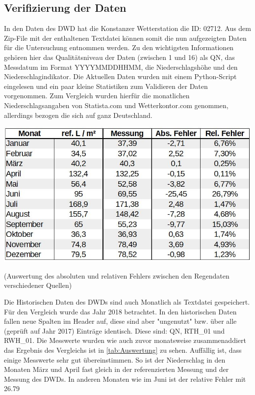 \subsection{Verifizierung der Daten}
In den Daten des DWD hat die Konstanzer Wetterstation die ID: 02712. Aus dem Zip-File mit der enthaltenen Textdatei können somit die nun aufgezeigten Daten für die Untersuchung entnommen werden. Zu den wichtigsten Informationen gehören hier das Qualitätsniveau der Daten (zwischen 1 und 16) als QN, das Messdatum im Format YYYYMMDDHHMM, die Niederschlagshöhe und den Niederschlagindikator. Die Aktuellen Daten wurden mit einem Python-Script eingelesen und ein paar kleine Statistiken zum Validieren der Daten vorgenommen. Zum Vergleich wurden hierfür die monatlichen Niederschlagsangaben von Statista.com und Wetterkontor.com genommen, allerdings bezogen die sich auf ganz Deutschland. 
\begin{table}[ht]
\centering
\includegraphics[width=\linewidth]{pics/Auswertung_Thomas}
\caption{(Auswertung des absoluten und relativen Fehlers zwischen den Regendaten verschiedener Quellen)}
\label{tab:Auswertung}
\end{table}
Die Historischen Daten des DWDs sind auch Monatlich als Textdatei gespeichert. Für den Vergleich wurde das Jahr 2018 betrachtet. In den historischen Daten fallen neue Spalten im Header auf, diese sind aber "ungenutzt" bzw. über alle (geprüft auf Jahr 2017) Einträge identisch. Diese sind: QN, RTH_01 und RWH_01. Die Messwerte wurden wie auch zuvor monatsweise zusammenaddiert das Ergebnis des Vergleichs ist in \ref{tab:Auswertung} zu sehen. 
Auffällig ist, dass einige Messwerte sehr gut übereinstimmen. So ist der Niederschlag in den Monaten März und April fast gleich in der referenzierten Messung und der Messung des DWDs. In anderen Monaten wie im Juni ist der relative Fehler mit 26.79 %

